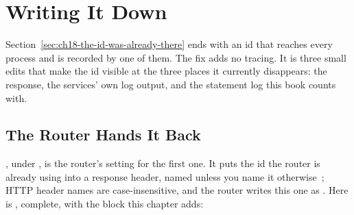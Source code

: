 \section{Writing It Down}
\label{sec:ch18-writing-it-down}

%
Section~\ref{sec:ch18-the-id-was-already-there} ends with an id that reaches
every process and is recorded by one of them. The fix adds no tracing. It is three small edits that make the id visible at
the three places it currently disappears: the response, the services' own log output, and the
statement log this book counts with.

\subsection{The Router Hands It Back}

%
, under , is the router's
setting for the first one. It puts the id the router is already using into a
response header, named  unless you name it otherwise~\autocite{cosmotelemetry}; HTTP header names are
case-insensitive, and the router writes this one as . Here is , complete,
with the block this chapter adds:

